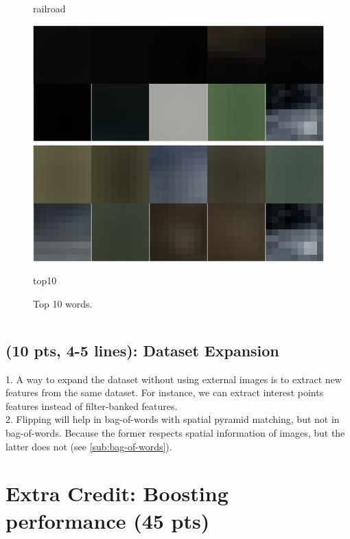 \documentclass[12pt]{article}
\newcounter{list}
\begin{document}
\begin{figure}[!htbp]
\begin{minipage}[t]{0.2 \textwidth}
    \caption*{railroad}
  \end{minipage}
  \begin{minipage}[t]{0.45 \textwidth}
    \centering \includegraphics[width= \linewidth]{./figures/railroad_top10}
    \centering \includegraphics[width= \linewidth]{./figures/railroad2_top10}  
    \caption*{top10}
  \end{minipage}
\caption{Top 10 words.}
\label{fig:top10}
\end{figure}

\begin{lstlisting}

\end{lstlisting}

\subsection{(10 pts, 4-5 lines): Dataset Expansion}
1. A way to expand the dataset without using external images is to extract new features from the same dataset. For instance, we can extract interest points features instead of filter-banked features.\\
2. Flipping will help in bag-of-words with spatial pyramid matching, but not in bag-of-words. Because the former respects spatial information of images, but the latter does not (see \ref{sub:bag-of-words}).

\section{Extra Credit: Boosting performance (45 pts)}
\end{document}
